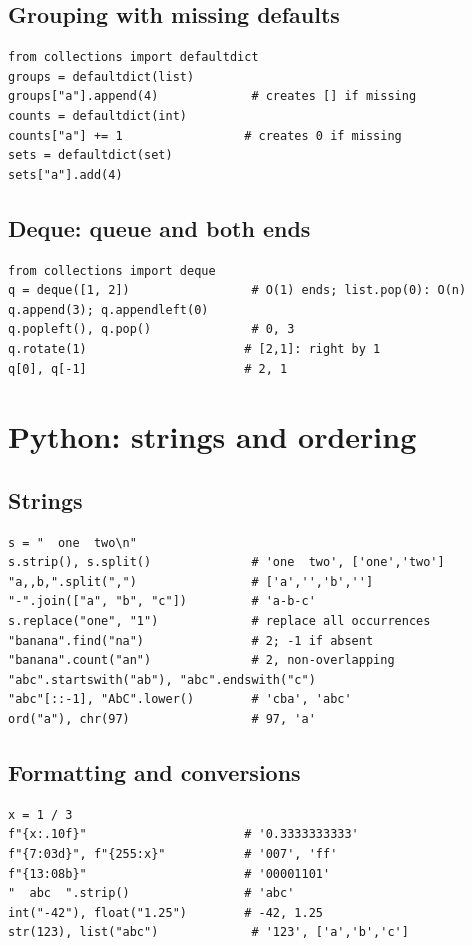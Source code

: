 \subsection{Grouping with missing defaults}
\begin{lstlisting}[label=py:defaultdict]
from collections import defaultdict
groups = defaultdict(list)
groups["a"].append(4)             # creates [] if missing
counts = defaultdict(int)
counts["a"] += 1                 # creates 0 if missing
sets = defaultdict(set)
sets["a"].add(4)
\end{lstlisting}

\subsection{Deque: queue and both ends}
\begin{lstlisting}[label=py:deque]
from collections import deque
q = deque([1, 2])                 # O(1) ends; list.pop(0): O(n)
q.append(3); q.appendleft(0)
q.popleft(), q.pop()              # 0, 3
q.rotate(1)                      # [2,1]: right by 1
q[0], q[-1]                      # 2, 1
\end{lstlisting}



\section{Python: strings and ordering}

\subsection{Strings}
\begin{lstlisting}[label=py:strings]
s = "  one  two\n"
s.strip(), s.split()              # 'one  two', ['one','two']
"a,,b,".split(",")                # ['a','','b','']
"-".join(["a", "b", "c"])         # 'a-b-c'
s.replace("one", "1")             # replace all occurrences
"banana".find("na")               # 2; -1 if absent
"banana".count("an")              # 2, non-overlapping
"abc".startswith("ab"), "abc".endswith("c")
"abc"[::-1], "AbC".lower()        # 'cba', 'abc'
ord("a"), chr(97)                 # 97, 'a'
\end{lstlisting}

\subsection{Formatting and conversions}
\begin{lstlisting}[label=py:format]
x = 1 / 3
f"{x:.10f}"                      # '0.3333333333'
f"{7:03d}", f"{255:x}"           # '007', 'ff'
f"{13:08b}"                      # '00001101'
"  abc  ".strip()                # 'abc'
int("-42"), float("1.25")        # -42, 1.25
str(123), list("abc")             # '123', ['a','b','c']
\end{lstlisting}

